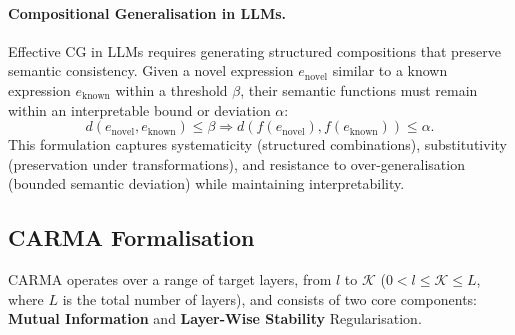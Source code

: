 \paragraph{Compositional Generalisation in LLMs.} Effective CG in LLMs requires generating structured compositions that preserve semantic consistency. Given a novel expression $e_{\text{novel}}$ similar to a known expression $e_{\text{known}}$ within a threshold $\beta$, their semantic functions must remain within an interpretable bound or deviation $\alpha$:
\begin{equation}
d(e_{\text{novel}}, e_{\text{known}}) \leq \beta \Rightarrow d(f(e_{\text{novel}}), f(e_{\text{known}})) \leq \alpha.
\end{equation}
This formulation captures systematicity (structured combinations), substitutivity (preservation under transformations), and resistance to over-generalisation (bounded semantic deviation) while maintaining interpretability.


\subsection{CARMA Formalisation}
CARMA operates over a range of target layers, from \( l \) to \( \mathcal{K}\) (\( 0 < l \leq \mathcal{K} \leq L \), where \( L \) is the total number of layers), and consists of two core components: \textbf{Mutual Information} and \textbf{Layer-Wise Stability} Regularisation.


